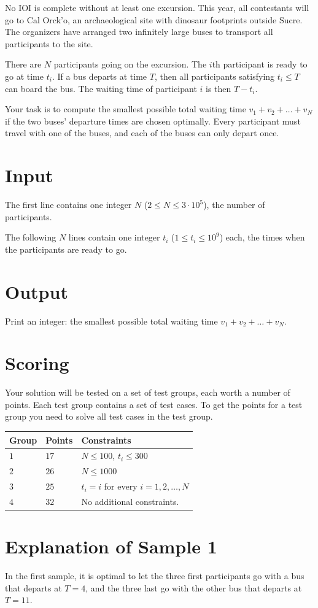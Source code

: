 \noindent


No IOI is complete without at least one excursion. This year, all contestants 
will go to Cal Orck'o, an archaeological site with dinosaur footprints outside Sucre. 
The organizers have arranged two infinitely large buses to transport 
all participants to the site.

There are $N$ participants going on the excursion. The $i$th participant is ready to
go at time $t_i$. If a bus departs at time $T$, then all participants satisfying 
$t_i \leq T$ can board the bus. The waiting time of participant $i$ is then $T-t_i$.

Your task is to compute the smallest possible total waiting time $v_1+v_2+\dots+v_N$ 
if the two buses' departure times are chosen optimally. Every participant must 
travel with one of the buses, and each of the buses can only depart once. 

\section*{Input}
The first line contains one integer $N$ ($2 \leq N \leq 3 \cdot 10^5$), the number of participants.

The following $N$ lines contain one integer $t_i$ ($1 \leq t_i \leq 10^9$) each, the 
times when the participants are ready to go.

\section*{Output}
Print an integer: the smallest possible total waiting time $v_1+v_2+\dots+v_N$.

\section*{Scoring}
Your solution will be tested on a set of test groups, each worth a number of points. Each test group contains
a set of test cases. To get the points for a test group you need to solve all test cases in the test group.

\noindent
\begin{tabular}{| l | l | p{12cm} |}
  \hline
  \textbf{Group} & \textbf{Points} & \textbf{Constraints} \\ \hline
  $1$    & $17$        & $N \leq 100$, $t_i \leq 300$\\ \hline
  $2$    & $26$        & $N \leq 1000$ \\ \hline
  $3$    & $25$        & $t_i = i$ for every $i = 1,2,\dots, N$ \\ \hline
  $4$    & $32$        & No additional constraints. \\ \hline
\end{tabular}

\section*{Explanation of Sample 1}

In the first sample, it is optimal to let the three first participants go
with a bus that departs at $T = 4$, and the three last go with the other bus 
that departs at $T = 11$.

